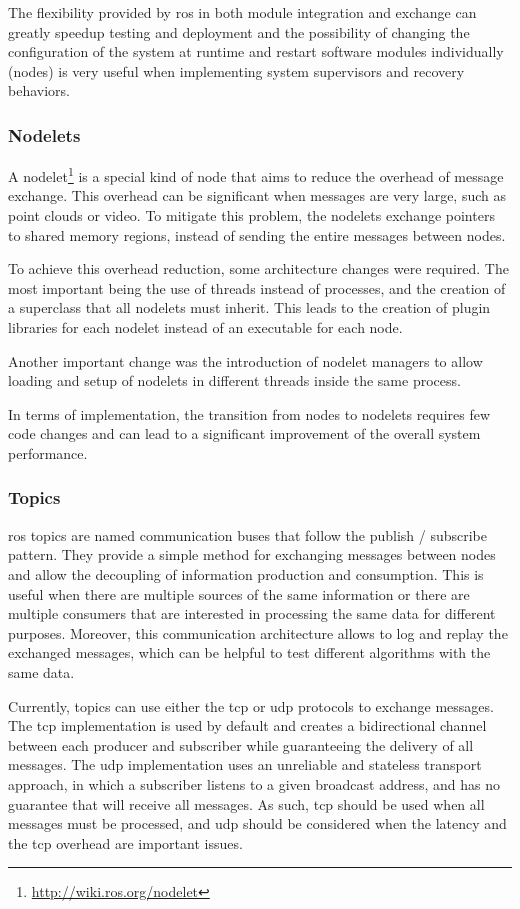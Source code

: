 The flexibility provided by \gls{ros} in both module integration and exchange can greatly speedup testing and deployment and the possibility of changing the configuration of the system at runtime and restart software modules individually (nodes) is very useful when implementing system supervisors and recovery behaviors.


\subsubsection{Nodelets}

A nodelet\footnote{\url{http://wiki.ros.org/nodelet}} is a special kind of node that aims to reduce the overhead of message exchange. This overhead can be significant when messages are very large, such as point clouds or video. To mitigate this problem, the nodelets exchange pointers to shared memory regions, instead of sending the entire messages between nodes.

To achieve this overhead reduction, some architecture changes were required. The most important being the use of threads instead of processes, and the creation of a superclass that all nodelets must inherit. This leads to the creation of plugin libraries for each nodelet instead of an executable for each node.

Another important change was the introduction of nodelet managers to allow loading and setup of nodelets in different threads inside the same process.

In terms of implementation, the transition from nodes to nodelets requires few code changes and can lead to a significant improvement of the overall system performance.


\subsubsection{Topics}

\gls{ros} topics are named communication buses that follow the publish / subscribe pattern. They provide a simple method for exchanging messages between nodes and allow the decoupling of information production and consumption. This is useful when there are multiple sources of the same information or there are multiple consumers that are interested in processing the same data for different purposes. Moreover, this communication architecture allows to log and replay the exchanged messages, which can be helpful to test different algorithms with the same data.

Currently, topics can use either the \gls{tcp} or \gls{udp} protocols to exchange messages. The \gls{tcp} implementation is used by default and creates a bidirectional channel between each producer and subscriber while guaranteeing the delivery of all messages. The \gls{udp} implementation uses an unreliable and stateless transport approach, in which a subscriber listens to a given broadcast address, and has no guarantee that will receive all messages. As such, \gls{tcp} should be used when all messages must be processed, and \gls{udp} should be considered when the latency and the \gls{tcp} overhead are important issues.


